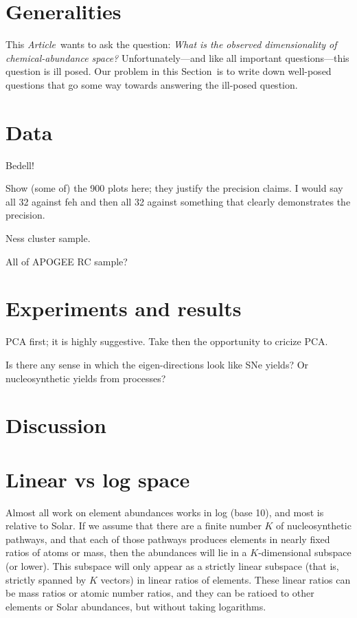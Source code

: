\documentclass[letterpaper, modern]{aastex62}
\newcommand{\documentname}{\textsl{Article}}
\newcommand{\sectionname}{Section}
\begin{document}
\section{Generalities}

This \documentname\ wants to ask the question:
\emph{What is the observed dimensionality of chemical-abundance
  space?}
Unfortunately---and like all important questions---this question is
ill posed.
Our problem in this \sectionname\ is to write down well-posed questions
that go some way towards answering the ill-posed question.

\section{Data}

Bedell!

Show (some of) the 900 plots here; they justify the precision claims.
I would say all 32 against feh and then all 32 against something that
clearly demonstrates the precision.

Ness cluster sample.

All of APOGEE RC sample?

\section{Experiments and results}

PCA first; it is highly suggestive. Take then the opportunity to cricize PCA.

Is there any sense in which the eigen-directions look like SNe yields?
Or nucleosynthetic yields from processes?

\section{Discussion}

\appendix
\section{Linear vs log space}

Almost all work on element abundances works in log (base 10), and most is
relative to Solar.
If we assume that there are a finite number $K$ of nucleosynthetic pathways,
and that each of those pathways produces elements in nearly fixed
ratios of atoms or mass, then the abundances will lie in a $K$-dimensional
subspace (or lower).
This subspace will only appear as a strictly linear subspace (that is, strictly
spanned by $K$ vectors) in linear ratios of elements.
These linear ratios can be mass ratios or atomic number ratios, and they can be ratioed
to other elements or Solar abundances, but without taking logarithms.
\end{document}
